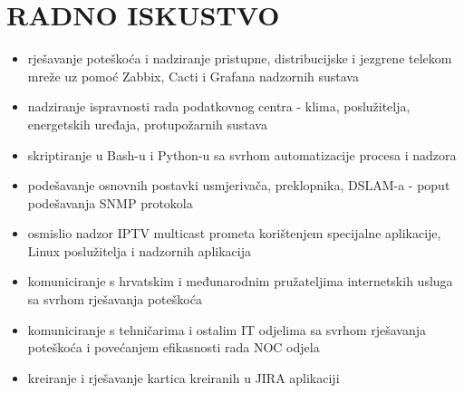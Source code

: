 \documentclass{cv}
\begin{document}
\section{RADNO ISKUSTVO}
\begin{itemize}
    \setlength\itemsep{0.1cm}
    \item rješavanje poteškoća i nadziranje pristupne, distribucijske i jezgrene telekom mreže uz pomoć Zabbix, Cacti i Grafana nadzornih sustava
    \item nadziranje ispravnosti rada podatkovnog centra - klima, poslužitelja, energetskih uređaja, protupožarnih sustava
    \item skriptiranje u Bash-u i Python-u sa svrhom automatizacije procesa i nadzora
    \item podešavanje osnovnih postavki usmjerivača, preklopnika, DSLAM-a - poput podešavanja SNMP protokola
    \item osmislio nadzor IPTV multicast prometa korištenjem specijalne aplikacije, Linux poslužitelja i nadzornih aplikacija
    \item komuniciranje s hrvatskim i međunarodnim pružateljima internetskih usluga sa svrhom rješavanja poteškoća
    \item komuniciranje s tehničarima i ostalim IT odjelima sa svrhom rješavanja poteškoća i povećanjem efikasnosti rada NOC odjela
    \item kreiranje i rješavanje kartica kreiranih u JIRA aplikaciji
\end{itemize}
\end{document}
